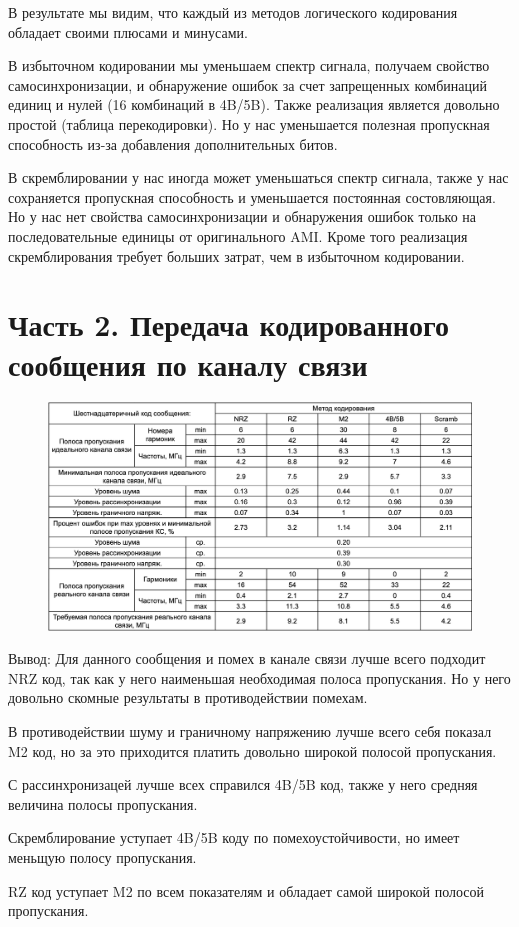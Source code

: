 \documentclass[12pt,onecolumn]{article}
\begin{document}
В результате мы видим, что каждый из методов логического кодирования обладает своими плюсами и минусами.

В избыточном кодировании мы уменьшаем спектр сигнала, получаем свойство самосинхронизации, и обнаружение ошибок за счет запрещенных комбинаций единиц и нулей (16 комбинаций в 4B/5B). Также реализация является довольно простой (таблица перекодировки). Но у нас уменьшается полезная пропускная способность из-за добавления дополнительных битов. 

В скремблировании у нас иногда может уменьшаться спектр сигнала, также у нас сохраняется пропускная способность и уменьшается постоянная состовляющая. Но у нас нет свойства самосинхронизации и обнаружения ошибок только на последовательные единицы от оригинального AMI.
Кроме того реализация скремблирования требует больших затрат, чем в избыточном кодировании. 

\section{Часть 2. Передача кодированного сообщения по каналу связи}
\begin{figure}[H]
    \centering
    \includegraphics[width=\textwidth]{image/table3.png}
\end{figure}

Вывод:
Для данного сообщения и помех в канале связи лучше всего подходит NRZ код, так как у него наименьшая необходимая полоса пропускания. Но у него довольно скомные результаты в противодействии помехам.

В противодействии шуму и граничному напряжению лучше всего себя показал M2 код, но за это приходится платить довольно широкой полосой пропускания.

С рассинхронизацей лучше всех справился 4B/5B код, также у него средняя величина полосы пропускания.

Скремблирование уступает 4B/5B коду по помехоустойчивости, но имеет меньщую полосу пропускания. 

RZ код уступает M2 по всем показателям и обладает самой широкой полосой пропускания.
\end{document}
